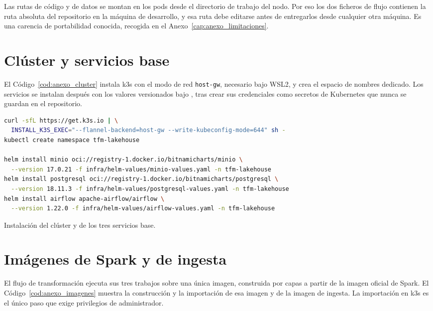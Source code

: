 Las rutas de código y de datos se montan en los pods desde el directorio de
trabajo del nodo. Por eso los dos ficheros de flujo contienen la ruta
absoluta del repositorio en la máquina de desarrollo, y esa ruta debe
editarse antes de entregarlos desde cualquier otra máquina. Es una carencia
de portabilidad conocida, recogida en el Anexo~\ref{cap:anexo_limitaciones}.

\section{Clúster y servicios base}
\label{sec:anexo_reproduccion_servicios}

El Código~\ref{cod:anexo_cluster} instala k3s con el modo de red
\texttt{host-gw}, necesario bajo WSL2, y crea el espacio de nombres
dedicado. Los servicios se instalan después con los valores versionados bajo
, tras crear sus credenciales como secretos de
Kubernetes que nunca se guardan en el repositorio.

\begin{code}[H]
\begin{lstlisting}[language=bash, basicstyle=\footnotesize\ttfamily, breaklines=true]
curl -sfL https://get.k3s.io | \
  INSTALL_K3S_EXEC="--flannel-backend=host-gw --write-kubeconfig-mode=644" sh -
kubectl create namespace tfm-lakehouse

helm install minio oci://registry-1.docker.io/bitnamicharts/minio \
  --version 17.0.21 -f infra/helm-values/minio-values.yaml -n tfm-lakehouse
helm install postgresql oci://registry-1.docker.io/bitnamicharts/postgresql \
  --version 18.11.3 -f infra/helm-values/postgresql-values.yaml -n tfm-lakehouse
helm install airflow apache-airflow/airflow \
  --version 1.22.0 -f infra/helm-values/airflow-values.yaml -n tfm-lakehouse
\end{lstlisting}
\caption{Instalación del clúster y de los tres servicios base.}
\label{cod:anexo_cluster}
\end{code}

\section{Imágenes de Spark y de ingesta}
\label{sec:anexo_reproduccion_imagenes}

El flujo de transformación ejecuta sus tres trabajos sobre una única
imagen, construida por capas a partir de la imagen oficial de Spark. El
Código~\ref{cod:anexo_imagenes} muestra la construcción y la importación de
esa imagen y de la imagen de ingesta. La importación en k3s es el único paso
que exige privilegios de administrador.

